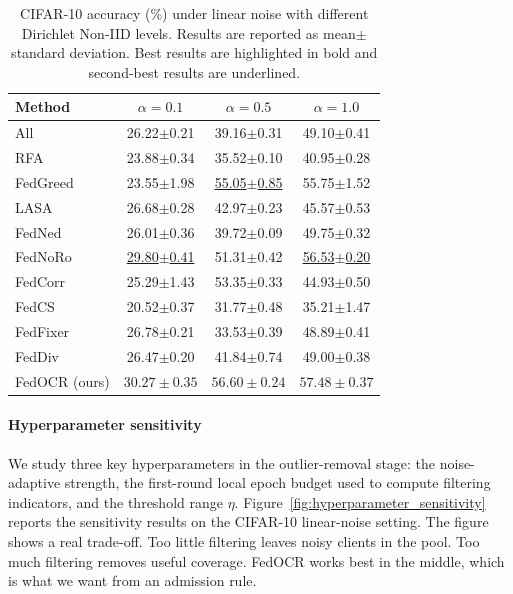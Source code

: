 ﻿\documentclass[conference]{IEEEtran}
\theoremstyle{definition}
\theoremstyle{remark}
\begin{document}
\begin{table}[h]
\centering
\caption{\normalfont CIFAR-10 accuracy (\%) under linear noise with different Dirichlet Non-IID levels. Results are reported as mean$\pm$standard deviation. Best results are highlighted in bold and second-best results are underlined.}
\label{tab:noniid_robustness}
\setlength{\tabcolsep}{5pt}
\renewcommand{\arraystretch}{1.10}
\begin{tabular}{lccc}
\toprule
\textbf{Method} & $\alpha=0.1$ & $\alpha=0.5$ & $\alpha=1.0$ \\
\midrule
All & 26.22$\pm$0.21 & 39.16$\pm$0.31 & 49.10$\pm$0.41 \\
RFA~\cite{pillutla2022robust} & 23.88$\pm$0.34 & 35.52$\pm$0.10 & 40.95$\pm$0.28 \\
FedGreed~\cite{kritharakis2025fedgreed} & 23.55$\pm$1.98 & \underline{55.05$\pm$0.85} & 55.75$\pm$1.52 \\
LASA~\cite{xu2025lasa} & 26.68$\pm$0.28 & 42.97$\pm$0.23 & 45.57$\pm$0.53 \\
FedNed~\cite{lu2024fedned} & 26.01$\pm$0.36 & 39.72$\pm$0.09 & 49.75$\pm$0.32 \\
FedNoRo~\cite{wu2023fednoro} & \underline{29.80$\pm$0.41} & 51.31$\pm$0.42 & \underline{56.53$\pm$0.20} \\
FedCorr~\cite{xu2022fedcorr} & 25.29$\pm$1.43 & 53.35$\pm$0.33 & 44.93$\pm$0.50 \\
FedCS~\cite{hao2025fedcs} & 20.52$\pm$0.37 & 31.77$\pm$0.48 & 35.21$\pm$1.47 \\
FedFixer~\cite{ji2024fedfixer} & 26.78$\pm$0.21 & 33.53$\pm$0.39 & 48.89$\pm$0.41 \\
FedDiv~\cite{li2024feddiv} & 26.47$\pm$0.20 & 41.84$\pm$0.74 & 49.00$\pm$0.38 \\
\midrule
FedOCR (ours) & $\boldsymbol{30.27\pm0.35}$ & $\boldsymbol{56.60\pm0.24}$ & $\boldsymbol{57.48\pm0.37}$ \\
\bottomrule
\end{tabular}
\end{table}
\paragraph{\textbf{Hyperparameter sensitivity}}
We study three key hyperparameters in the outlier-removal stage: the noise-adaptive strength, the first-round local epoch budget used to compute filtering indicators, and the threshold range $\eta$.
Figure~\ref{fig:hyperparameter_sensitivity} reports the sensitivity results on the CIFAR-10 linear-noise setting.
The figure shows a real trade-off.
Too little filtering leaves noisy clients in the pool.
Too much filtering removes useful coverage.
FedOCR works best in the middle, which is what we want from an admission rule.
\end{document}
